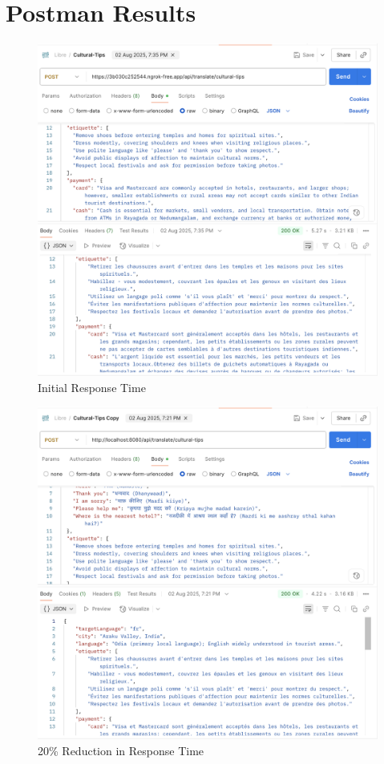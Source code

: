\section{Postman Results}
\begin{figure}[H]
    \centering
    \includegraphics[width=0.6\linewidth]{images/Backend/Translation_Service_first_iteration.png}
    \caption{Initial Response Time}
    \label{fig:intial_response_time}
\end{figure}

\begin{figure}[H]
    \centering
    \includegraphics[width=0.6\linewidth]{images/Backend/Translation_Service_20_Red.png}
    \caption{20\% Reduction in Response Time}
    \label{fig:20_reduction_response}
\end{figure}

